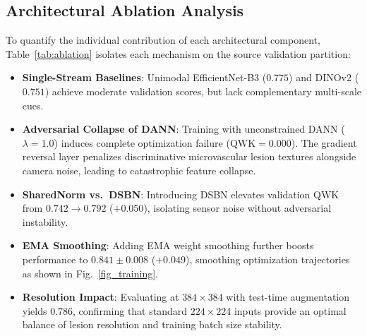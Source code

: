 \documentclass[conference]{IEEEtran}
\begin{document}
\begin{table}[htbp]
    \centering
    \caption{Class-Wise Diagnostic Performance on Held-Out Messidor-2 Cohort (Mean $\pm$ Std Dev across $N=3$ seeds)}
    \label{tab:per_class_metrics}
\end{table}

\subsection{Architectural Ablation Analysis}
To quantify the individual contribution of each architectural component, Table~\ref{tab:ablation} isolates each mechanism on the source validation partition:
\begin{itemize}
    \item \textbf{Single-Stream Baselines}: Unimodal EfficientNet-B3 ($0.775$) and DINOv2 ($0.751$) achieve moderate validation scores, but lack complementary multi-scale cues.
    \item \textbf{Adversarial Collapse of DANN}: Training with unconstrained DANN ($\lambda = 1.0$) induces complete optimization failure ($\text{QWK} = 0.000$). The gradient reversal layer penalizes discriminative microvascular lesion textures alongside camera noise, leading to catastrophic feature collapse.
    \item \textbf{SharedNorm vs.\ DSBN}: Introducing DSBN elevates validation QWK from $0.742 \rightarrow 0.792$ ($+0.050$), isolating sensor noise without adversarial instability.
    \item \textbf{EMA Smoothing}: Adding EMA weight smoothing further boosts performance to $\mathbf{0.841 \pm 0.008}$ ($+0.049$), smoothing optimization trajectories as shown in Fig.~\ref{fig_training}.
    \item \textbf{Resolution Impact}: Evaluating at $384 \times 384$ with test-time augmentation yields $0.786$, confirming that standard $224 \times 224$ inputs provide an optimal balance of lesion resolution and training batch size stability.
\end{itemize}
\end{document}
